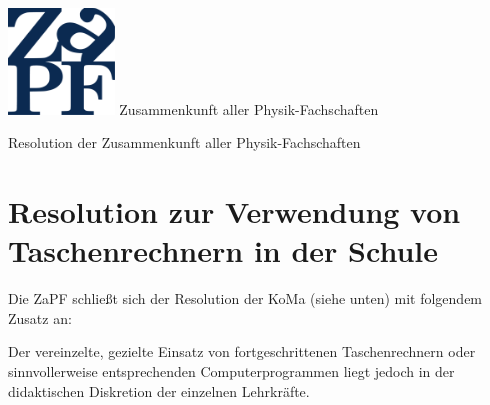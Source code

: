 \documentclass[DIV=calc]{scrartcl}
\begin{document}
\hspace{0.87\textwidth}
\begin{minipage}{120pt}
\vspace{-1.8cm}
\includegraphics[width=80pt]{logo.pdf}
\centering
\small Zusammenkunft aller Physik-Fachschaften
\end{minipage}
\begin{center}
\huge{Resolution der Zusammenkunft aller Physik-Fachschaften} \\
\normalsize
\end{center}

\vspace{1cm}
\section*{Resolution zur Verwendung von Taschenrechnern in der Schule}
Die ZaPF schließt sich der Resolution der KoMa (siehe unten) mit folgendem Zusatz an:

Der vereinzelte, gezielte Einsatz von fortgeschrittenen Taschenrechnern oder sinnvollerweise
entsprechenden Computerprogrammen liegt jedoch in der didaktischen Diskretion der einzelnen
Lehrkräfte.
\end{document}
